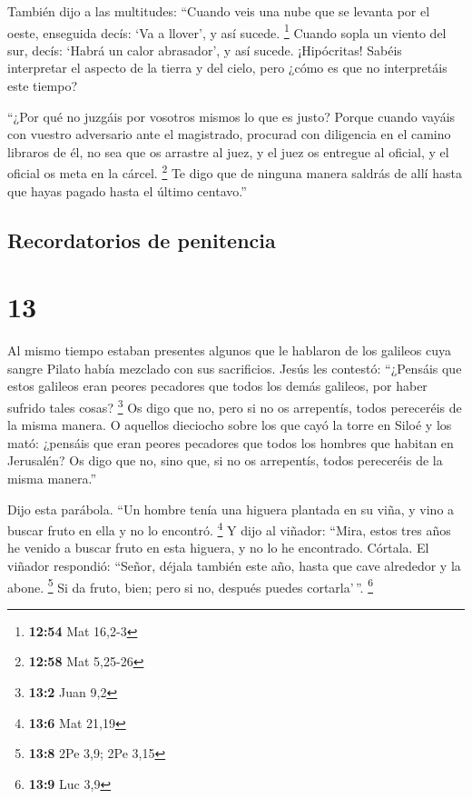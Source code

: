  También dijo a las multitudes: ``Cuando veis una nube
que se levanta por el oeste, enseguida decís: `Va a llover', y así
sucede. \footnote{\textbf{12:54} Mat 16,2-3}  Cuando
sopla un viento del sur, decís: `Habrá un calor abrasador', y así
sucede.  ¡Hipócritas! Sabéis interpretar el aspecto de la
tierra y del cielo, pero ¿cómo es que no interpretáis este tiempo?

 ``¿Por qué no juzgáis por vosotros mismos lo que es
justo?  Porque cuando vayáis con vuestro adversario ante
el magistrado, procurad con diligencia en el camino libraros de él, no
sea que os arrastre al juez, y el juez os entregue al oficial, y el
oficial os meta en la cárcel. \footnote{\textbf{12:58} Mat 5,25-26}
 Te digo que de ninguna manera saldrás de allí hasta que
hayas pagado hasta el último centavo.''

\hypertarget{recordatorios-de-penitencia}{%
\subsection{Recordatorios de
penitencia}\label{recordatorios-de-penitencia}}

\hypertarget{section-12}{%
\section{13}\label{section-12}}

 Al mismo tiempo estaban presentes algunos que le hablaron
de los galileos cuya sangre Pilato había mezclado con sus sacrificios.
 Jesús les contestó: ``¿Pensáis que estos galileos eran
peores pecadores que todos los demás galileos, por haber sufrido tales
cosas? \footnote{\textbf{13:2} Juan 9,2}  Os digo que no,
pero si no os arrepentís, todos pereceréis de la misma manera.
 O aquellos dieciocho sobre los que cayó la torre en Siloé
y los mató: ¿pensáis que eran peores pecadores que todos los hombres que
habitan en Jerusalén?  Os digo que no, sino que, si no os
arrepentís, todos pereceréis de la misma manera.''

 Dijo esta parábola. ``Un hombre tenía una higuera
plantada en su viña, y vino a buscar fruto en ella y no lo encontró.
\footnote{\textbf{13:6} Mat 21,19}  Y dijo al viñador:
``Mira, estos tres años he venido a buscar fruto en esta higuera, y no
lo he encontrado. Córtala.  El viñador respondió: ``Señor,
déjala también este año, hasta que cave alrededor y la abone.
\footnote{\textbf{13:8} 2Pe 3,9; 2Pe 3,15}  Si da fruto,
bien; pero si no, después puedes cortarla'\,''. \footnote{\textbf{13:9}
  Luc 3,9}

